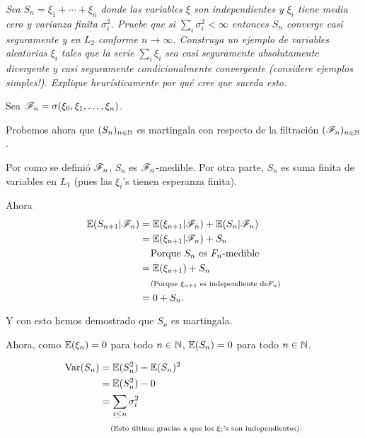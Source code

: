 \emph{
    Sea $S_n=\xi_1+\cdots+\xi_n$ donde las variables $\xi$ son independientes y $\xi_i$ tiene 
    media cero y varianza finita $\sigma_i^2$. Pruebe que si $\sum_i \sigma_i^2<\infty$ entonces 
    $S_n$ converge casi seguramente y en $L_2$ conforme $n\to\infty$. Construya un ejemplo de 
    variables aleatorias $\xi_i$ tales que la serie $\sum_i \xi_i$ sea casi seguramente absolutamente 
    divergente y casi seguramente condicionalmente convergente (considere ejemplos simples!). 
    Explique heur\'isticamente por qu\'e cree que suceda esto.
}

\afterstatement\pn

Sea $\mathscr{F}_n = \sigma( \xi_0, \xi_1, \dots, \xi_n)$.\pn


Probemos ahora que $(S_n)_{n \in \mathbb{N}}$ es martingala con respecto de la \newline 
filtración $(\mathscr{F}_n)_{n \in \mathbb{N}}$.\pn

Por como se definió $\mathscr{F}_n$, $S_n$ es $\mathscr{F}_n$-medible. Por otra parte, $S_n$ es suma finita de variables en $L_1$ 
(pues las $\xi_i$'s tienen esperanza finita).\pn

Ahora
\begin{align}
    \mathbb{E}(S_{n+1} | \mathscr{F}_n)  &=  \mathbb{E}(\xi_{n+1} | \mathscr{F}_n) + \mathbb{E}(S_n | \mathscr{F}_n)                       \\
                        &=  \mathbb{E}(\xi_{n+1} | \mathscr{F}_n) + S_n                                  \\
                        &\;\;\;\;\mbox{Porque $S_n$ es $F_n$-medible}                   \\
                        &=  \mathbb{E}(\xi_{n+1}) + S_n                                         \\
                        &\;\;\;\;\mbox{{\scriptsize(Porque $\xi_{n+1}$ es independiente de$F_n$)}}        	\\
                        &=  0 + S_n.                                                    \\
\end{align}\pn

Y con esto hemos demostrado que $S_n$ es martingala.\pn

Ahora, como $\mathbb{E}(\xi_n) = 0$ para todo $n \in \mathbb{N}$, $\mathbb{E}(S_n) = 0$ para todo $n \in \mathbb{N}$.

\begin{align}
        \text{Var}\! \left( S_n \right)       &=  \mathbb{E}(S_n^2) - \mathbb{E}(S_n)^2                                               \\
                        &=  \mathbb{E}(S_n^2) - 0                                                       \\
                        &=  \sum_{i \leq n} \sigma_i^2                                          \\
                        &\;\;\;\;\mbox{{\scriptsize(Esto último gracias a que los $\xi_i$'s son independientes)}}.
\end{align}

